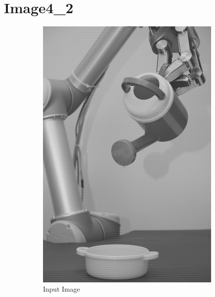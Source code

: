 \documentclass[11pt]{article}
\numberwithin{equation}{section}
\begin{document}
\section{Image4\_2}
\begin{figure}[h]
	\centering
	\begin{subfigure}[b]{0.4\textwidth}
		\includegraphics[width=\textwidth]{fig/Image4_2.png}
		\caption{Input Image}
		\label{fig:inputimage42}
	\end{subfigure} \qquad
	\begin{subfigure}[b]{0.4\textwidth}

\end{subfigure}
\end{figure}
\end{document}
